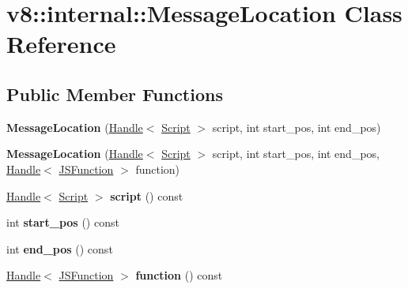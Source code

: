 \hypertarget{classv8_1_1internal_1_1_message_location}{}\section{v8\+:\+:internal\+:\+:Message\+Location Class Reference}
\label{classv8_1_1internal_1_1_message_location}
\subsection*{Public Member Functions}
\begin{DoxyCompactItemize}
\item 
{\bfseries Message\+Location} (\hyperlink{classv8_1_1internal_1_1_handle}{Handle}$<$ \hyperlink{classv8_1_1internal_1_1_script}{Script} $>$ script, int start\+\_\+pos, int end\+\_\+pos)\hypertarget{classv8_1_1internal_1_1_message_location_ab3acbbdff769f414fbae9f269e805e06}{}\label{classv8_1_1internal_1_1_message_location_ab3acbbdff769f414fbae9f269e805e06}

\item 
{\bfseries Message\+Location} (\hyperlink{classv8_1_1internal_1_1_handle}{Handle}$<$ \hyperlink{classv8_1_1internal_1_1_script}{Script} $>$ script, int start\+\_\+pos, int end\+\_\+pos, \hyperlink{classv8_1_1internal_1_1_handle}{Handle}$<$ \hyperlink{classv8_1_1internal_1_1_j_s_function}{J\+S\+Function} $>$ function)\hypertarget{classv8_1_1internal_1_1_message_location_ad0874257499561f88a7a66505c5f403a}{}\label{classv8_1_1internal_1_1_message_location_ad0874257499561f88a7a66505c5f403a}

\item 
\hyperlink{classv8_1_1internal_1_1_handle}{Handle}$<$ \hyperlink{classv8_1_1internal_1_1_script}{Script} $>$ {\bfseries script} () const \hypertarget{classv8_1_1internal_1_1_message_location_aa98b33884231005b9cfed256d8419ad1}{}\label{classv8_1_1internal_1_1_message_location_aa98b33884231005b9cfed256d8419ad1}

\item 
int {\bfseries start\+\_\+pos} () const \hypertarget{classv8_1_1internal_1_1_message_location_aa22e9e2ef0cee82c768d66a65c7f318f}{}\label{classv8_1_1internal_1_1_message_location_aa22e9e2ef0cee82c768d66a65c7f318f}

\item 
int {\bfseries end\+\_\+pos} () const \hypertarget{classv8_1_1internal_1_1_message_location_aca7e0f537ff0eccbfb2c9b586890968f}{}\label{classv8_1_1internal_1_1_message_location_aca7e0f537ff0eccbfb2c9b586890968f}

\item 
\hyperlink{classv8_1_1internal_1_1_handle}{Handle}$<$ \hyperlink{classv8_1_1internal_1_1_j_s_function}{J\+S\+Function} $>$ {\bfseries function} () const \hypertarget{classv8_1_1internal_1_1_message_location_a2dbcff6be6c25f1a510b90bf42c648d9}{}\label{classv8_1_1internal_1_1_message_location_a2dbcff6be6c25f1a510b90bf42c648d9}

\end{DoxyCompactItemize}
